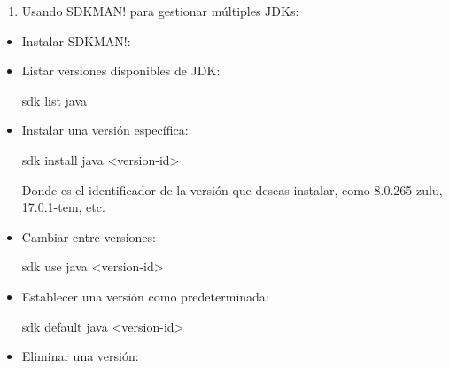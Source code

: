 \documentclass[
  jou,
  floatsintext,
  longtable,
  a4paper,
  nolmodern,
  notxfonts,
  notimes,
  12pt,
  colorlinks=true,linkcolor=blue,citecolor=blue,urlcolor=blue]{apa7}
\newenvironment{Shaded}{\begin{snugshade}}{\end{snugshade}}
\newcommand{\AttributeTok}[1]{\textcolor[rgb]{0.40,0.45,0.13}{#1}}
\newcommand{\BuiltInTok}[1]{\textcolor[rgb]{0.00,0.23,0.31}{#1}}
\newcommand{\ExtensionTok}[1]{\textcolor[rgb]{0.00,0.23,0.31}{#1}}
\newcommand{\FunctionTok}[1]{\textcolor[rgb]{0.28,0.35,0.67}{#1}}
\newcommand{\KeywordTok}[1]{\textcolor[rgb]{0.00,0.23,0.31}{\textbf{#1}}}
\newcommand{\NormalTok}[1]{\textcolor[rgb]{0.00,0.23,0.31}{#1}}
\newcommand{\OperatorTok}[1]{\textcolor[rgb]{0.37,0.37,0.37}{#1}}
\newcommand{\StringTok}[1]{\textcolor[rgb]{0.13,0.47,0.30}{#1}}
\newcommand{\VariableTok}[1]{\textcolor[rgb]{0.07,0.07,0.07}{#1}}
\providecommand{\tightlist}{%
  \setlength{\itemsep}{0pt}\setlength{\parskip}{0pt}}
\begin{document}
\begin{enumerate}
\def\labelenumi{\arabic{enumi}.}
\tightlist
\item
  Usando SDKMAN! para gestionar múltiples JDKs:
\end{enumerate}

\begin{itemize}
\item
  Instalar SDKMAN!:

\begin{Shaded}
\end{Shaded}
\item
  Listar versiones disponibles de JDK:

\begin{Shaded}
\begin{Highlighting}[]
\ExtensionTok{sdk}\NormalTok{ list java}
\end{Highlighting}
\end{Shaded}
\item
  Instalar una versión específica:

\begin{Shaded}
\begin{Highlighting}[]
\ExtensionTok{sdk}\NormalTok{ install java }\OperatorTok{\textless{}}\NormalTok{version{-}id}\OperatorTok{\textgreater{}}
\end{Highlighting}
\end{Shaded}

  Donde es el identificador de la versión que deseas instalar, como
  8.0.265-zulu, 17.0.1-tem, etc.
\item
  Cambiar entre versiones:

\begin{Shaded}
\begin{Highlighting}[]
\ExtensionTok{sdk}\NormalTok{ use java }\OperatorTok{\textless{}}\NormalTok{version{-}id}\OperatorTok{\textgreater{}}
\end{Highlighting}
\end{Shaded}
\item
  Establecer una versión como predeterminada:

\begin{Shaded}
\begin{Highlighting}[]
\ExtensionTok{sdk}\NormalTok{ default java }\OperatorTok{\textless{}}\NormalTok{version{-}id}\OperatorTok{\textgreater{}}
\end{Highlighting}
\end{Shaded}
\item
  Eliminar una versión:


\end{itemize}
\end{document}
